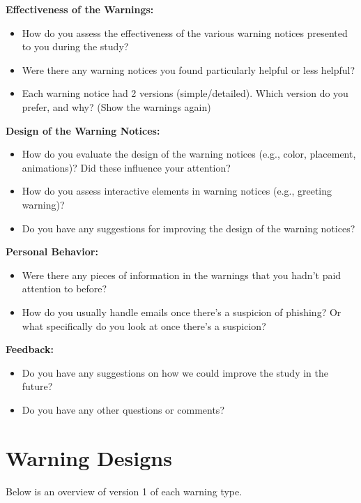\documentclass[
  a4paper,  %
  twoside,  %
  bibliography=totoc,
  headsepline,
  cleardoublepage=empty,
  parskip=half,
  draft=false
]{scrbook}
\begin{document}
\textbf{Effectiveness of the Warnings:
}
    \begin{itemize}
        \item How do you assess the effectiveness of the various warning notices presented to you during the study?
        \item Were there any warning notices you found particularly helpful or less helpful?
        \item Each warning notice had 2 versions (simple/detailed). Which version do you prefer, and why? (Show the warnings again)
    \end{itemize}

\textbf{Design of the Warning Notices:}

    \begin{itemize}
        \item How do you evaluate the design of the warning notices (e.g., color, placement, animations)? Did these influence your attention?
        \item How do you assess interactive elements in warning notices (e.g., greeting warning)?
        \item Do you have any suggestions for improving the design of the warning notices?
    \end{itemize}

\textbf{Personal Behavior:
}
    \begin{itemize}
        \item Were there any pieces of information in the warnings that you hadn't paid attention to before?
        \item How do you usually handle emails once there's a suspicion of phishing? Or what specifically do you look at once there's a suspicion?
    \end{itemize}

\textbf{Feedback:
}
    \begin{itemize}
        \item Do you have any suggestions on how we could improve the study in the future?
        \item Do you have any other questions or comments?
    \end{itemize}

\newpage   
\section{Warning Designs}
\label{sec:warnings}
Below is an overview of version 1 of each warning type.
\end{document}
